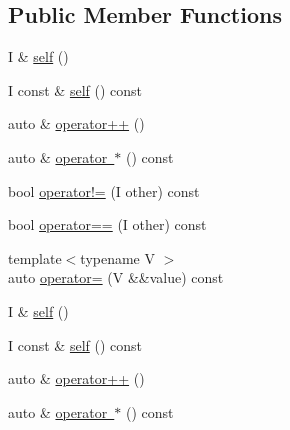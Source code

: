 \subsection*{Public Member Functions}
\begin{DoxyCompactItemize}
\item 
I \& \mbox{\hyperlink{structrah_1_1iterator__facade_3_01_i_00_01_r_00_01std_1_1output__iterator__tag_01_4_a9602e6a110edd67b6ea4a1894f88be01}{self}} ()
\item 
I const  \& \mbox{\hyperlink{structrah_1_1iterator__facade_3_01_i_00_01_r_00_01std_1_1output__iterator__tag_01_4_affe2cc30de7c9e5ea2f5f11e70fe24af}{self}} () const
\item 
auto \& \mbox{\hyperlink{structrah_1_1iterator__facade_3_01_i_00_01_r_00_01std_1_1output__iterator__tag_01_4_a25875a0ae0f0c22b7ff5f25d97a04724}{operator++}} ()
\item 
auto \& \mbox{\hyperlink{structrah_1_1iterator__facade_3_01_i_00_01_r_00_01std_1_1output__iterator__tag_01_4_a7c68323dc18e20b6f946223ee54d88c8}{operator $\ast$}} () const
\item 
bool \mbox{\hyperlink{structrah_1_1iterator__facade_3_01_i_00_01_r_00_01std_1_1output__iterator__tag_01_4_a3c3fc4b28b04fade22ea33a8c14f2771}{operator!=}} (I other) const
\item 
bool \mbox{\hyperlink{structrah_1_1iterator__facade_3_01_i_00_01_r_00_01std_1_1output__iterator__tag_01_4_a7ddab65a78bdd6b9fec8f4d122fbf731}{operator==}} (I other) const
\item 
{\footnotesize template$<$typename V $>$ }\\auto \mbox{\hyperlink{structrah_1_1iterator__facade_3_01_i_00_01_r_00_01std_1_1output__iterator__tag_01_4_aa5052339259412e552022ef533c31c67}{operator=}} (V \&\&value) const
\item 
I \& \mbox{\hyperlink{structrah_1_1iterator__facade_3_01_i_00_01_r_00_01std_1_1output__iterator__tag_01_4_a9602e6a110edd67b6ea4a1894f88be01}{self}} ()
\item 
I const  \& \mbox{\hyperlink{structrah_1_1iterator__facade_3_01_i_00_01_r_00_01std_1_1output__iterator__tag_01_4_affe2cc30de7c9e5ea2f5f11e70fe24af}{self}} () const
\item 
auto \& \mbox{\hyperlink{structrah_1_1iterator__facade_3_01_i_00_01_r_00_01std_1_1output__iterator__tag_01_4_a25875a0ae0f0c22b7ff5f25d97a04724}{operator++}} ()
\item 
auto \& \mbox{\hyperlink{structrah_1_1iterator__facade_3_01_i_00_01_r_00_01std_1_1output__iterator__tag_01_4_a7c68323dc18e20b6f946223ee54d88c8}{operator $\ast$}} () const

\end{DoxyCompactItemize}
